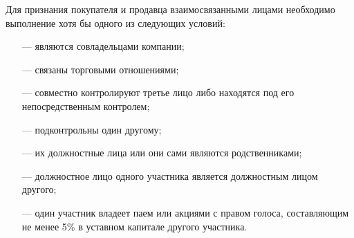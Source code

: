 Для признания покупателя и продавца взаимосвязанными лицами необходимо выполнение хотя бы одного из следующих условий:
\begin{enumerate}
	\item [---] являются совладельцами компании;
	\item [---] связаны торговыми отношениями;
	\item [---] совместно контролируют третье лицо либо находятся под его непосредственным контролем;
	\item [---] подконтрольны один другому;
	\item [---] их должностные лица или они сами являются родственниками;
	\item [---] должностное лицо одного участника является должностным лицом другого;
	\item [---] один участник владеет паем или акциями с правом голоса, составляющим не менее 5\% в уставном капитале другого участника.
\end{enumerate}

